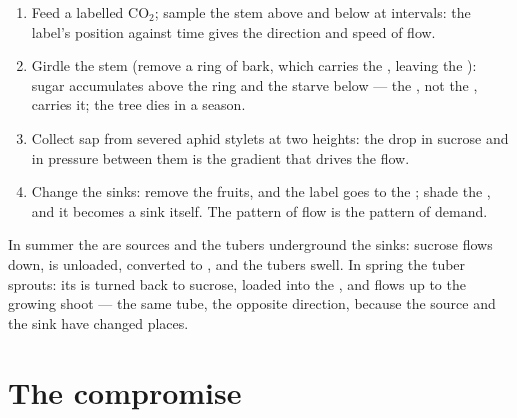 \begin{method}\label{met:b1:plant-transport:translocation}
\begin{enumerate}
  \item Feed a  labelled $\mathrm{CO_2}$; sample the stem above
        and below at intervals: the label's position against time
        gives the direction and speed of flow.
  \item Girdle the stem (remove a ring of bark, which carries the
        , leaving the ): sugar accumulates above the ring
        and the  starve below --- the , not the ,
        carries it; the tree dies in a season.
  \item Collect sap from severed aphid stylets at two heights: the
        drop in sucrose and in pressure between them is the gradient
        that drives the flow.
  \item Change the sinks: remove the fruits, and the label goes to the
        ; shade the , and it becomes a sink itself. The
        pattern of flow is the pattern of demand.
\end{enumerate}
\end{method}

\begin{example}\label{ex:b1:plant-transport:potato}
In summer the  are sources and the tubers underground the
sinks: sucrose flows down, is unloaded, converted to , and the
tubers swell. In spring the tuber sprouts: its  is turned back
to sucrose, loaded into the , and flows up to the growing shoot
--- the same tube, the opposite direction, because the source and the
sink have changed places.
\end{example}

\section{The compromise}

